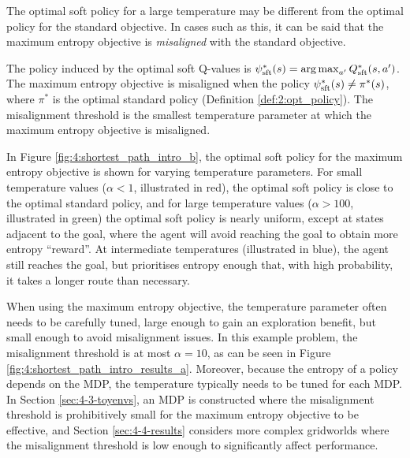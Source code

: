     The optimal soft policy for a large temperature may be different from the optimal policy for the standard objective. In cases such as this, it can be said that the maximum entropy objective is \textit{misaligned} with the standard objective. 
    \begin{defn} 
        \label{def:4:misalignment}
        The policy induced by the optimal soft Q-values is $\psi^*_{{\textnormal{sft}}}(s) = \operatorname*{arg\,max}_{a'} Q^*_{{\textnormal{sft}}}(s,a')$. The maximum entropy objective is \textnormal{misaligned} when the policy $\psi^*_{{\textnormal{sft}}}(s) \neq \pi^*(s)$, where $\pi^*$ is the optimal standard policy (Definition \ref{def:2:opt_policy}). The \textnormal{misalignment threshold} is the smallest temperature parameter at which the maximum entropy objective is misaligned.
    \end{defn}

    In Figure \ref{fig:4:shortest_path_intro_b}, the optimal soft policy for the maximum entropy objective is shown for varying temperature parameters. For small temperature values ($\alpha<1$, illustrated in red), the optimal soft policy is close to the optimal standard policy, and for large temperature values ($\alpha>100$, illustrated in green) the optimal soft policy is nearly uniform, except at states adjacent to the goal, where the agent will avoid reaching the goal to obtain more entropy ``reward''. At intermediate temperatures (illustrated in blue), the agent still reaches the goal, but prioritises entropy enough that, with high probability, it takes a longer route than necessary.

    When using the maximum entropy objective, the temperature parameter often needs to be carefully tuned, large enough to gain an exploration benefit, but small enough to avoid misalignment issues.  In this example problem, the misalignment threshold is at most $\alpha=10$, as can be seen in Figure \ref{fig:4:shortest_path_intro_results_a}. Moreover, because the entropy of a policy depends on the MDP, the temperature typically needs to be tuned for each MDP. In Section \ref{sec:4-3-toyenvs}, an MDP is constructed where the misalignment threshold is prohibitively small for the maximum entropy objective to be effective, and Section \ref{sec:4-4-results} considers more complex gridworlds where the misalignment threshold is low enough to significantly affect performance.




